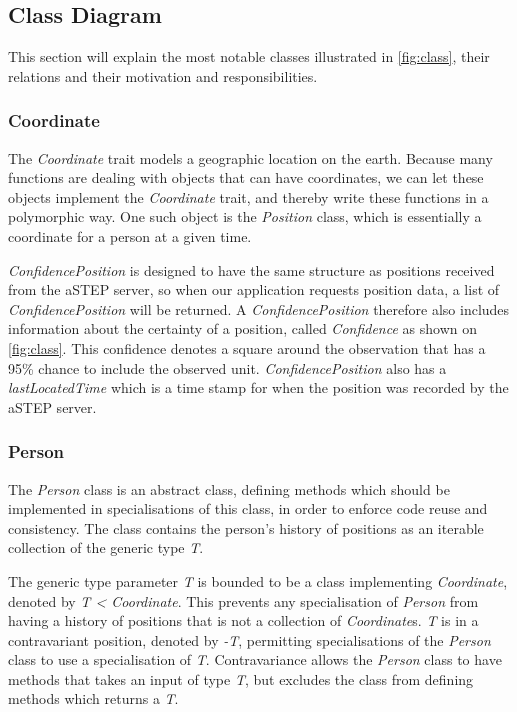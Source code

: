 \subsection{Class Diagram}
This section will explain the most notable classes illustrated in \cref{fig:class}, their relations and their motivation and responsibilities.

\subsubsection{Coordinate}
The \emph{Coordinate} trait models a geographic location on the earth. Because many functions are dealing with objects that can have coordinates, we can let these objects implement the \emph{Coordinate} trait, and thereby write these functions in a polymorphic way. One such object is the \emph{Position} class, which is essentially a coordinate for a person at a given time.

\emph{ConfidencePosition} is designed to have the same structure as positions received from the aSTEP server, so when our application requests position data, a list of \emph{ConfidencePosition} will be returned. A \emph{ConfidencePosition} therefore also includes information about the certainty of a position, called \emph{Confidence} as shown on \cref{fig:class}. This confidence denotes a square around the observation that has a 95\% chance to include the observed unit\cite{cisco}. \emph{ConfidencePosition} also has a \emph{lastLocatedTime} which is a time stamp for when the position was recorded by the aSTEP server.

\subsubsection{Person}
The \emph{Person} class is an abstract class, defining methods which should be implemented in specialisations of this class, in order to enforce code reuse and consistency. The class contains the person's history of positions as an iterable collection of the generic type \emph{T}. 

The generic type parameter \emph{T} is bounded to be a class implementing \emph{Coordinate}, denoted by \emph{T < Coordinate}. This prevents any specialisation of \emph{Person} from having a history of positions that is not a collection of \emph{Coordinate}s. \emph{T} is in a contravariant position, denoted by \emph{-T}, permitting specialisations of the \emph{Person} class to use a specialisation of \emph{T}. Contravariance allows the \emph{Person} class to have methods that takes an input of type \emph{T}, but excludes the class from defining methods which returns a \emph{T}. 

